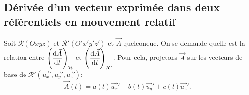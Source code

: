     \subsection{Dérivée d'un vecteur exprimée dans deux référentiels en mouvement relatif}

        Soit $\mathcal{R}(Oxyz)$ et $\mathcal{R}'(O'x'y'z')$ et $\vec{A}$ quelconque. On se demande quelle est la relation entre $\left(\dfrac{\mathrm{d}\vec{A}}{\mathrm{d} t}\right)_{\mathcal{R}}$ et $\left(\dfrac{\mathrm{d}\vec{A}}{\mathrm{d} t}\right)_{\mathcal{R}'}$. Pour cela, projetons $\vec{A}$ sur les vecteurs de base de $\mathcal{R}'(\vec{u_x}',\vec{u_y}',\vec{u_z}')$:
        \begin{equation}
            \vec{A}(t) = a(t)\vec{u_x}'+b(t)\vec{u_y}'+c(t)\vec{u_z}'.
        \end{equation}

